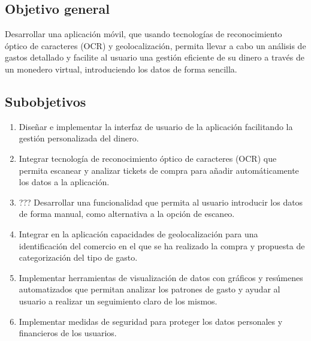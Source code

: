 \subsection{Objetivo general}
Desarrollar una aplicación móvil, que usando tecnologías de reconocimiento
óptico de caracteres (OCR) y geolocalización, permita llevar a cabo un 
análisis de gastos detallado y facilite al usuario una gestión eficiente de su dinero
a través de un monedero virtual, introduciendo los datos de 
forma sencilla.

\subsection{Subobjetivos}
\begin{enumerate}
    \item Diseñar e implementar la interfaz de usuario de la aplicación facilitando
        la gestión personalizada del dinero.
    \item Integrar tecnología de reconocimiento óptico de caracteres (OCR) que 
        permita escanear y analizar tickets de compra para añadir automáticamente 
        los datos a la aplicación.
    \item ??? Desarrollar una funcionalidad que permita al usuario introducir los datos 
        de forma manual, como alternativa a la opción de escaneo.
    \item Integrar en la aplicación capacidades de geolocalización para una 
        identificación del comercio en el que se ha realizado la compra y 
         propuesta de categorización del tipo de gasto.     
    \item Implementar herramientas de visualización de datos con gráficos y resúmenes 
        automatizados que permitan analizar los patrones de gasto y ayudar al usuario 
        a realizar un seguimiento claro de los mismos.
    \item Implementar medidas de seguridad para proteger los datos personales y 
        financieros de los usuarios.
    
\end{enumerate}
